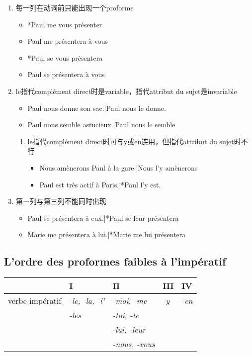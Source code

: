 \documentclass[UTF8]{report}
\begin{document}
\begin{enumerate}
    \item 每一列在动词前只能出现一个proforme
    \begin{itemize}
        \item *Paul me vous présenter
        \item Paul me présentera à vous
        \item *Paul se vous présentera
        \item Paul se présentera à vous
    \end{itemize}
    \item le指代complément direct时是variable，指代attribut du sujet是invariable
    \begin{itemize}
        \item Paul nous donne son sac.|Paul nous le donne.
        \item Paul nous semble astucieux.|Paul nous le semble
    \end{itemize}
    \begin{enumerate}
        \item le指代complément direct时可与y或en连用，但指代attribut du sujet时不行
        \begin{itemize}
            \item Nous amènerons Paul à la gare.|Nous l’y amènerons
            \item Paul est très actif à Paris.|*Paul l’y est.
        \end{itemize}
    \end{enumerate}
    \item 第一列与第三列不能同时出现
    \begin{itemize}
        \item Paul se présentera à eux.|*Paul se leur présentera
        \item Marie me présentera à lui.|*Marie me lui présentera
    \end{itemize}
\end{enumerate}

\subsection{L’ordre des proformes faibles à l’impératif}
\begin{table}[H]
\centering
\begin{tabular}{|l|l|l|l|l|}
\hline
\textbf{} & \textbf{I} & \textbf{II} & \textbf{III} & \textbf{IV} \\
\hline
verbe impératif & \textit{-le, -la, -l'} & \textit{-moi, -me} & \textit{-y} & \textit{-en} \\
& \textit{-les} & \textit{-toi, -te} & & \\
& & \textit{-lui, -leur} & & \\
& & \textit{-nous, -vous} & & \\
\hline
\end{tabular}
\end{table}
\end{document}
